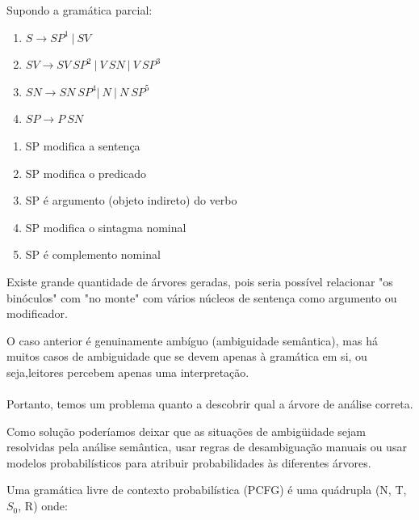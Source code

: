 Supondo a gramática parcial:

\begin{enumerate}
  \item $ S \rightarrow SP^1 \ |\ SV $
  \item $ SV \rightarrow SV \ SP^2  \ |\  V \ SN \ |\ V \ SP^3 $
  \item $ SN \rightarrow SN \ SP^4  | \  N \  |  \ N \ SP^5 $
  \item $ SP \rightarrow P \ SN  $
\end{enumerate}

\begin{enumerate}
    \tiny
    \item SP modifica a sentença
    \item SP modifica o predicado
    \item SP é argumento (objeto indireto) do verbo
    \item SP modifica o sintagma nominal
    \item SP é complemento nominal
\end{enumerate}


Existe grande quantidade de árvores geradas, pois seria possível relacionar "os binóculos" com "no monte" com vários núcleos de sentença como argumento ou modificador.


O caso anterior é genuinamente ambíguo (ambiguidade semântica), mas há muitos casos de ambiguidade que se devem apenas à gramática em si, ou seja,leitores percebem apenas uma interpretação.
\\ \\


 Portanto, temos um problema quanto a descobrir qual a árvore de análise correta.

 Como solução poderíamos deixar que as situações de ambigüidade sejam resolvidas pela análise semântica, usar regras de desambiguação manuais ou usar modelos probabilísticos para atribuir probabilidades às diferentes árvores.


 Uma gramática livre de contexto probabilística (PCFG) é uma quádrupla (N, T, $S_0$, R) onde:

